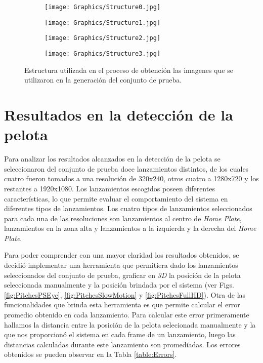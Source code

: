 \begin{figure}[!h]
    \centering
    \begin{subfigure}[b]{0.49\linewidth}
        \texttt{[image: Graphics/Structure0.jpg]}
    \end{subfigure}
    \begin{subfigure}[b]{0.49\linewidth}
        \texttt{[image: Graphics/Structure1.jpg]}
    \end{subfigure}
    \begin{subfigure}[b]{0.49\linewidth}
        \texttt{[image: Graphics/Structure2.jpg]}
    \end{subfigure}
    \begin{subfigure}[b]{0.49\linewidth}
        \texttt{[image: Graphics/Structure3.jpg]}
    \end{subfigure}
	\caption{Estructura utilizada en el proceso de obtención las imagenes que se utilizaron en la generación del conjunto de prueba.}
	\label{fig:Structure}
\end{figure}

\section{Resultados en la detección de la pelota}

Para analizar los resultados alcanzados en la detección de la pelota se seleccionaron del conjunto de prueba doce lanzamientos distintos, de los cuales cuatro fueron tomados a una resolución de 320x240, otros cuatro a 1280x720 y los restantes a 1920x1080. Los lanzamientos escogidos poseen diferentes características, lo que permite evaluar el comportamiento del sistema en diferentes tipos de lanzamientos. Los cuatro tipos de lanzamientos seleccionados para cada una de las resoluciones son lanzamientos al centro de \textit{Home Plate}, lanzamientos en la zona alta y lanzamientos a la izquierda y la derecha del \textit{Home Plate}.

Para poder comprender con una mayor claridad los resultados obtenidos, se decidió implementar una herramienta que permitiera dado los lanzamientos seleccionados del conjunto de prueba, graficar en \textit{3D} la posición de la pelota seleccionada manualmente y la posición brindada por el sistema (ver Figs. \ref{fig:PitchesPSEye}, \ref{fig:PitchesSlowMotion} y \ref{fig:PitchesFullHD}). Otra de las funcionalidades que brinda esta herramienta es que permite calcular el error promedio obtenido en cada lanzamiento. Para calcular este error primeramente hallamos la distancia entre la posición de la pelota selecionada manualmente y la que nos proporcionó el sistema en cada frame de un lanzamiento, luego las distancias calculadas durante este lanzamiento son promediadas. Los errores obtenidos se pueden observar en la Tabla \ref{table:Errors}.

